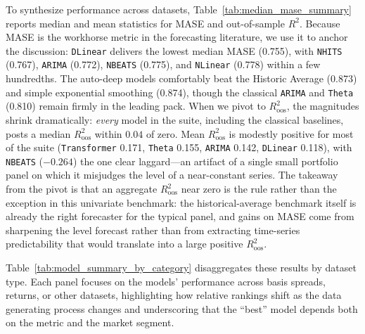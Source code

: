 \documentclass{article}
\newcommand{\floatsource}[1]{\caption*{\footnotesize\emph{#1}}}
\newcommand{\allsources}{Sources: Bloomberg, Board of Governors of the Federal Reserve System, Center for Research in Security Prices, Compustat, Call Reports, FINRA TRACE, OptionMetrics, S\&P Global, Open Source Bond Asset Pricing, He, Kelly, and Manela (2017), Authors' analysis}
\begin{document}
To synthesize performance across datasets, Table~\ref{tab:median_mase_summary} reports median and mean statistics for MASE and out-of-sample $R^2$. Because MASE is the workhorse metric in the forecasting literature, we use it to anchor the discussion: \texttt{DLinear} delivers the lowest median MASE (0.755), with \texttt{NHITS} (0.767), \texttt{ARIMA} (0.772), \texttt{NBEATS} (0.775), and \texttt{NLinear} (0.778) within a few hundredths. The auto-deep models comfortably beat the Historic Average (0.873) and simple exponential smoothing (0.874), though the classical \texttt{ARIMA} and \texttt{Theta} (0.810) remain firmly in the leading pack. When we pivot to $R^2_{\text{oos}}$, the magnitudes shrink dramatically: \emph{every} model in the suite, including the classical baselines, posts a median $R^2_{\text{oos}}$ within $0.04$ of zero. Mean $R^2_{\text{oos}}$ is modestly positive for most of the suite (\texttt{Transformer} 0.171, \texttt{Theta} 0.155, \texttt{ARIMA} 0.142, \texttt{DLinear} 0.118), with \texttt{NBEATS} ($-0.264$) the one clear laggard---an artifact of a single small portfolio panel on which it misjudges the level of a near-constant series. The takeaway from the pivot is that an aggregate $R^2_{\text{oos}}$ near zero is the rule rather than the exception in this univariate benchmark: the historical-average benchmark itself is already the right forecaster for the typical panel, and gains on MASE come from sharpening the level forecast rather than from extracting time-series predictability that would translate into a large positive $R^2_{\text{oos}}$.

\begin{table}[htbp]
\centering
\caption{Overall Model Performance Summary: MASE and R² Across All Datasets}
\label{tab:median_mase_summary}
\footnotesize

\caption*{\footnotesize \textbf{Note:} Summary statistics across all datasets for each model. MASE shows absolute performance (lower is better), and R² shows out-of-sample predictive power (higher is better). Models are sorted by median MASE.}
\floatsource{\allsources}
\end{table}

Table~\ref{tab:model_summary_by_category} disaggregates these results by dataset type. Each panel focuses on the models' performance across basis spreads, returns, or other datasets, highlighting how relative rankings shift as the data generating process changes and underscoring that the ``best'' model depends both on the metric and the market segment.
\end{document}
